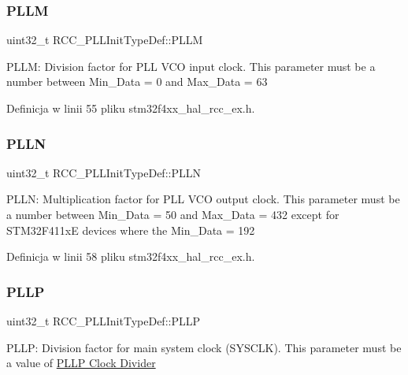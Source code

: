 \subsubsection{\texorpdfstring{P\+L\+LM}{PLLM}}
{\footnotesize\ttfamily uint32\+\_\+t R\+C\+C\+\_\+\+P\+L\+L\+Init\+Type\+Def\+::\+P\+L\+LM}

P\+L\+LM\+: Division factor for P\+LL V\+CO input clock. This parameter must be a number between Min\+\_\+\+Data = 0 and Max\+\_\+\+Data = 63 

Definicja w linii 55 pliku stm32f4xx\+\_\+hal\+\_\+rcc\+\_\+ex.\+h.

\mbox{\label{struct_r_c_c___p_l_l_init_type_def_a2482608639ebfffc51a41135c979369b}} 
\subsubsection{\texorpdfstring{P\+L\+LN}{PLLN}}
{\footnotesize\ttfamily uint32\+\_\+t R\+C\+C\+\_\+\+P\+L\+L\+Init\+Type\+Def\+::\+P\+L\+LN}

P\+L\+LN\+: Multiplication factor for P\+LL V\+CO output clock. This parameter must be a number between Min\+\_\+\+Data = 50 and Max\+\_\+\+Data = 432 except for S\+T\+M32\+F411xE devices where the Min\+\_\+\+Data = 192 

Definicja w linii 58 pliku stm32f4xx\+\_\+hal\+\_\+rcc\+\_\+ex.\+h.

\mbox{\label{struct_r_c_c___p_l_l_init_type_def_a4ecedf3ef401fa564aa636824fc3ded0}} 
\subsubsection{\texorpdfstring{P\+L\+LP}{PLLP}}
{\footnotesize\ttfamily uint32\+\_\+t R\+C\+C\+\_\+\+P\+L\+L\+Init\+Type\+Def\+::\+P\+L\+LP}

P\+L\+LP\+: Division factor for main system clock (S\+Y\+S\+C\+LK). This parameter must be a value of \hyperlink{group___r_c_c___p_l_l_p___clock___divider}{P\+L\+LP Clock Divider} 

